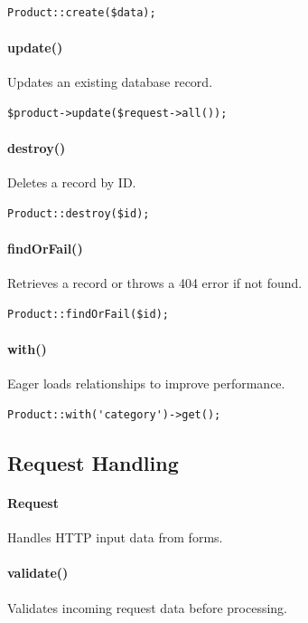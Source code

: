 \documentclass[12pt,a4paper]{article}
\begin{document}
\begin{verbatim}
Product::create($data);
\end{verbatim}

\paragraph{update()}
Updates an existing database record.

\begin{verbatim}
$product->update($request->all());
\end{verbatim}

\paragraph{destroy()}
Deletes a record by ID.

\begin{verbatim}
Product::destroy($id);
\end{verbatim}

\paragraph{findOrFail()}
Retrieves a record or throws a 404 error if not found.

\begin{verbatim}
Product::findOrFail($id);
\end{verbatim}

\paragraph{with()}
Eager loads relationships to improve performance.

\begin{verbatim}
Product::with('category')->get();
\end{verbatim}

\subsection{Request Handling}

\paragraph{Request}
Handles HTTP input data from forms.

\paragraph{validate()}
Validates incoming request data before processing.
\end{document}
